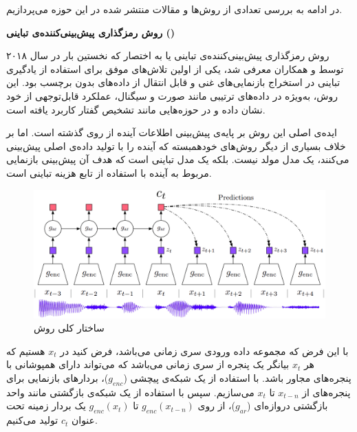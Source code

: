 در ادامه به بررسی تعدادی از روش‌ها و مقالات منتشر شده در این حوزه می‌پردازیم.\newline

\noindent\textbf{روش رمزگذاری پیش‌بینی‌کننده‌ی تباینی ()}\label{sec:CPC}

روش رمزگذاری پیش‌بینی‌کننده‌ی تباینی یا به اختصار 
که نخستین بار در سال ۲۰۱۸ توسط
و همکاران\cite{oord2018representation}
معرفی شد، یکی از اولین تلاش‌های موفق برای استفاده از یادگیری تباینی در استخراج بازنمایی‌های غنی و قابل انتقال از داده‌های بدون برچسب بود. این روش، به‌ویژه در داده‌های ترتیبی مانند صورت و سیگنال، عملکرد قابل‌توجهی از خود نشان داده و در حوزه‌هایی مانند تشخیص گفتار کاربرد یافته است.

ایده‌ی اصلی این روش بر پایه‌ی پیش‌بینی اطلاعات آینده از روی گذشته است. اما بر خلاف بسیاری از دیگر روش‌های
خودهمبسته
که آینده را با تولید داده‌ی اصلی پیش‌بینی می‌کنند، یک مدل مولد نیست. بلکه یک مدل تباینی است که هدف آن پیش‌بینی بازنمایی مربوط به آینده با استفاده از تابع هزینه تباینی است.

\begin{figure}[htb!]
\centering
\includegraphics[width=1\textwidth]{Images/Chapter2/cpc.png}
\caption{ساختار کلی روش }
\label{fig:cpc}
\end{figure}

با این فرض که مجموعه داده ورودی سری زمانی می‌باشد،
فرض کنید در $x_t$ هستیم
که هر $x_t$
بیانگر یک پنجره از سری زمانی می‌باشد که می‌تواند دارای همپوشانی با پنجره‌های مجاور باشد. با استفاده از یک شبکه‌ی پیچشی ($g_{enc}$)، بردارهای بازنمایی برای پنجره‌های از
$x_{t-n}$ تا $x_t$ می‌سازیم.
سپس با استفاده از یک شبکه‌ی بازگشتی مانند واحد بازگشتی دروازه‌ای ($g_{ar}$)،
از روی
$g_{enc}(x_{t-n})$ تا $g_{enc}(x_t)$
یک بردار زمینه تحت عنوان $c_t$
تولید می‌کنیم.

